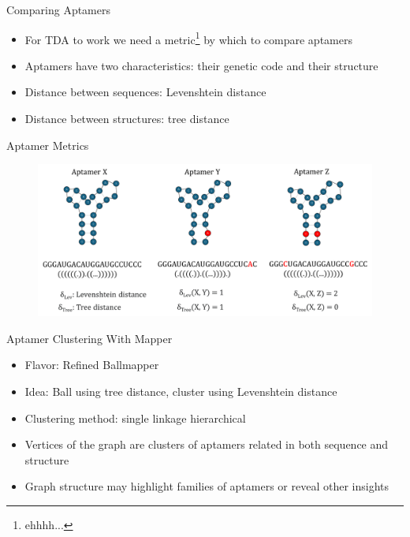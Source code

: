 \documentclass{beamer}
\begin{document}
\begin{frame}{Comparing Aptamers}
  \begin{itemize}
    \item For TDA to work we need a metric\footnote<1>{ehhhh...} by which to compare aptamers
    \item Aptamers have two characteristics: their genetic code and their structure
    \item Distance between sequences: Levenshtein distance
    \item Distance between structures: tree distance
  \end{itemize}
\end{frame}

\begin{frame}{Aptamer Metrics}
  \begin{figure}
    \begin{center}
      \hspace*{-.75cm}\includegraphics[width=1.15\textwidth]{aptamers.png}
    \end{center}
  \end{figure}
\end{frame}

\begin{frame}{Aptamer Clustering With Mapper}
  \begin{itemize}
    \item Flavor: Refined Ballmapper
    \item Idea: Ball using tree distance, cluster using Levenshtein distance
    \item Clustering method: single linkage hierarchical
    \item Vertices of the graph are clusters of aptamers related in both sequence and structure
    \item Graph structure may highlight families of aptamers or reveal other insights
  \end{itemize}
\end{frame}
\end{document}
